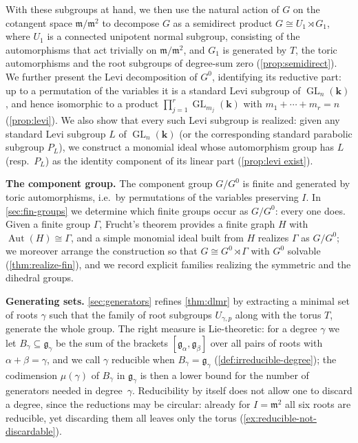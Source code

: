 \documentclass[11pt,letterpaper,reqno]{amsart}
\theoremstyle{remark}
\theoremstyle{definition}
\def\M{\mathfrak{m}}
\newcommand{\KK}[0]{\ensuremath{\mathbf{k}}}
\newcommand{\Aut}[0]{\ensuremath{\operatorname{Aut}}}
\newcommand{\GL}[0]{\ensuremath{\operatorname{GL}}}
\begin{document}
With these subgroups at hand, we then use the
natural action of $G$ on the cotangent space $\M/\M^2$ to decompose $G$ as a
semidirect product $G\cong U_1\rtimes G_1$, where $U_1$ is a connected unipotent
normal subgroup, consisting of the automorphisms that act trivially on
$\M/\M^2$, and $G_1$ is generated by $T$, the toric automorphisms and the root
subgroups of degree-sum zero (\cref{prop:semidirect}). We further present the Levi decomposition of $G^0$, identifying its reductive part:
up to a permutation of the variables it is a standard Levi subgroup of
$\GL_n(\KK)$, and hence isomorphic to a product $\prod_{j=1}^r\GL_{m_j}(\KK)$
with $m_1+\cdots+m_r=n$ (\cref{prop:levi}). We also show that every such Levi subgroup is realized:
given any standard Levi subgroup $L$ of $\GL_n(\KK)$ (or the corresponding
standard parabolic subgroup $P_L$), we construct a monomial ideal whose automorphism
group has $L$ (resp.~$P_L$) as the identity component of its linear part (\cref{prop:levi exist}).

\medskip\noindent\textbf{The component group.} The component group $G/G^0$ is
finite and generated by toric automorphisms, i.e.\ by permutations of the variables
preserving $I$. In \cref{sec:fin-groups} we determine which finite groups occur as
$G/G^0$: every one does. Given a finite group $\Gamma$, Frucht's theorem
\cite[Sections~2--3]{Frucht1939} provides a finite graph $H$ with $\Aut(H)\cong\Gamma$, and a simple
monomial ideal built from $H$ realizes $\Gamma$ as $G/G^0$; we moreover arrange the
construction so that $G\cong G^0\rtimes\Gamma$ with $G^0$ solvable (\cref{thm:realize-fin}), and we record
explicit families realizing the symmetric and the dihedral groups.

\medskip\noindent\textbf{Generating sets.} \cref{sec:generators}
refines \cref{thm:dlmr} by extracting a minimal set of roots $\gamma$ such that the family of root subgroups $U_{\gamma,p}$ along with the torus $T$, generate the whole group. The right measure is Lie-theoretic:
for a degree $\gamma$ we let $B_\gamma\subseteq\mathfrak g_\gamma$ be the sum of the brackets
$[\mathfrak g_\alpha,\mathfrak g_\beta]$ over all pairs of roots with $\alpha+\beta=\gamma$,
and we call $\gamma$ reducible when $B_\gamma=\mathfrak g_\gamma$
(\cref{def:irreducible-degree}); the codimension $\mu(\gamma)$ of $B_\gamma$ in
$\mathfrak g_\gamma$ is then a lower bound for the number of generators needed in
degree~$\gamma$. Reducibility by itself does not allow one to discard a degree, since the
reductions may be circular: already for $I=\M^2$ all six roots are reducible, yet
discarding them all leaves only the torus (\cref{ex:reducible-not-discardable}).
\end{document}
